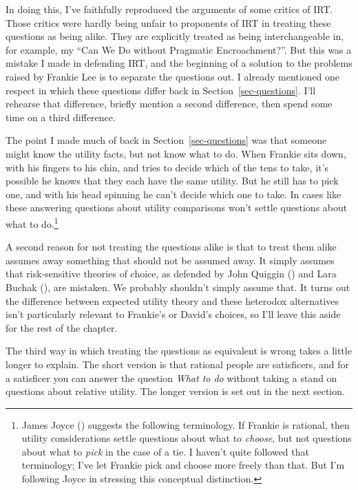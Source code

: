 \documentclass[
  10pt,
  letterpaper,
  twoside]{scrbook}
\begin{document}
In doing this, I've faithfully reproduced the arguments of some critics
of IRT. Those critics were hardly being unfair to proponents of IRT in
treating these questions as being alike. They are explicitly treated as
being interchangeable in, for example, my ``Can We Do without Pragmatic
Encroachment?''. But this was a mistake I made in defending IRT, and the
beginning of a solution to the problems raised by Frankie Lee is to
separate the questions out. I already mentioned one respect in which
these questions differ back in Section~\ref{sec-questions}. I'll
rehearse that difference, briefly mention a second difference, then
spend some time on a third difference.

The point I made much of back in Section~\ref{sec-questions} was that
someone might know the utility facts, but not know what to do. When
Frankie sits down, with his fingers to his chin, and tries to decide
which of the tens to take, it's possible he knows that they each have
the same utility. But he still has to pick one, and with his head
spinning he can't decide which one to take. In cases like these
answering questions about utility comparisons won't settle questions
about what to do.\footnote{James Joyce ()
  suggests the following terminology. If Frankie is rational, then
  utility considerations settle questions about what to \emph{choose},
  but not questions about what to \emph{pick} in the case of a tie. I
  haven't quite followed that terminology; I've let Frankie pick and
  choose more freely than that. But I'm following Joyce in stressing
  this conceptual distinction.}

A second reason for not treating the questions alike is that to treat
them alike assumes away something that should not be assumed away. It
simply assumes that risk-sensitive theories of choice, as defended by
John Quiggin () and Lara Buchak
(), are mistaken. We probably shouldn't
simply assume that. It turns out the difference between expected utility
theory and these heterodox alternatives isn't particularly relevant to
Frankie's or David's choices, so I'll leave this aside for the rest of
the chapter.

The third way in which treating the questions as equivalent is wrong
takes a little longer to explain. The short version is that rational
people are satisficers, and for a satisficer you can answer the question
\emph{What to do} without taking a stand on questions about relative
utility. The longer version is set out in the next section.
\end{document}
